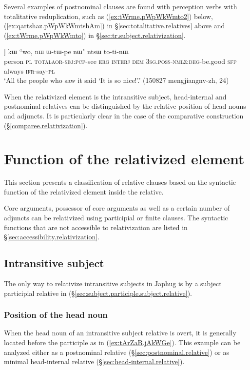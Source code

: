Several examples of postnominal clauses are found with perception verbs with totalitative reduplication, such as  (\ref{ex:tWrme.pWpWkWmto2})  below, (\ref{ex:qartshaz.pWpWkWmtshAm}) in §\ref{sec:totalitative.relatives} above and (\ref{ex:tWrme.pWpWkWmto}) in §\ref{sec:tr.subject.relativization}.
 
 \begin{exe}
\ex \label{ex:tWrme.pWpWkWmto2}
\gll [\textbf{tɯrme} \textbf{ra} [pɯ\redp{}pɯ-kɯ-mto]] kɯ ``wo, nɯ ɯ-tɯ-pe nɯ" ntsɯ to-ti-nɯ. \\
person \textsc{pl} \textsc{total}\redp{}\textsc{aor}-\textsc{sbj}:\textsc{pcp}-see \textsc{erg} \textsc{interj} \textsc{dem} \textsc{3sg}.\textsc{poss}-\textsc{nmlz}:\textsc{deg}-be.good \textsc{sfp} always \textsc{ifr}-say-\textsc{pl} \\
\glt `All the people who saw it said `It is so nice!'.' (150827 mengjiangnv-zh, 24)
\end{exe}
 
When the relativized element is the intransitive subject, head-internal and postnominal relatives can be distinguished by the relative position of head nouns and adjuncts. It is particularly clear in the case of the comparative construction (§\ref{comparee.relativization}).


\section{Function of the relativized element}\label{sec:function.relativization} 
This section presents a classification of relative clauses based on the syntactic function of the relativized element inside the relative. 

Core arguments, possessor of core arguments as well as a certain number of adjuncts can be relativized using participial or finite clauses. The syntactic functions that are not accessible to relativization are listed in §\ref{sec:accessibility.relativization}.


\subsection{Intransitive subject} \label{sec:intr.subject.relativization} 
The only way to relativize intransitive subjects in Japhug is by a subject participial relative in  (§\ref{sec:subject.participle.subject.relative}). 

\subsubsection{Position of the head noun} \label{sec:intr.subj.head.noun.position}
When the head noun of an intransitive subject relative is overt, it is generally located before the participle as in (\ref{ex:tArZaB.jAkWGe}). This example can be analyzed either as a postnominal relative (§\ref{sec:postnominal.relative}) or as minimal head-internal relative (§\ref{sec:head-internal.relative}).

